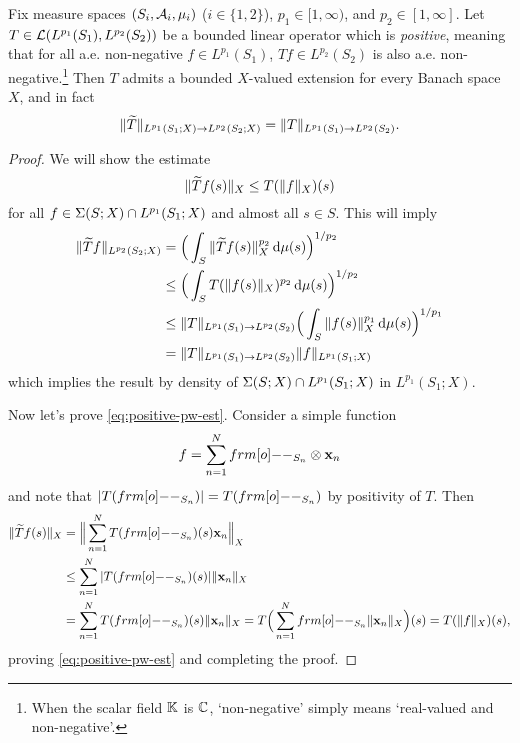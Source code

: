 \begin{thm}\label{thm:positive-extensions}
  Fix measure spaces $(S_i,\mathcal{A}_i,\mu_i)$ ($i \in \{1,2\}$), $p_1 \in [1,\infty)$, and $p_2 \in [1,\infty]$.
  Let $T \in \mathcal{L}(L^{p_1}(S_1),L^{p_2}(S_2))$ be a bounded linear operator which is \emph{positive}, meaning that for all a.e. non-negative $f \in L^{p_1}(S_1)$, $Tf \in L^{p_2}(S_2)$ is also a.e. non-negative.\footnote{When the scalar field $\mathbb{K}$ is $\mathbb{C}$, `non-negative' simply means `real-valued and non-negative'.}
  Then $T$ admits a bounded $X$-valued extension for every Banach space $X$, and in fact
  \begin{equation*}
    \|\widetilde{T}\|_{L^{p_1}(S_1;X) \to L^{p_2}(S_2;X)} = \|T\|_{L^{p_1}(S_1) \to L^{p_2}(S_2)}.
  \end{equation*}
\end{thm}

\begin{proof}
  We will show the estimate
  \begin{equation}\label{eq:positive-pw-est}
    \|\widetilde{T}f(s)\|_X \leq T(\|f\|_X)(s)
  \end{equation}
  for all $f \in \Sigma(S;X) \cap L^{p_1}(S_1;X)$ and almost all $s \in S$.
  This will imply
  \begin{equation*}
    \begin{aligned}
      \|\widetilde{T}f\|_{L^{p_2}(S_2;X)} &= \Big( \int_{S} \|\widetilde{T}f(s)\|_X^{p_2} \, \mathrm{d}\mu(s) \Big)^{1/p_2} \\
      &\leq \Big( \int_{S} T(\|f(s)\|_X)^{p_2} \, \mathrm{d}\mu(s) \Big)^{1/p_2}\\
      &\leq \|T\|_{L^{p_1}(S_1) \to L^{p_2}(S_2)} \Big( \int_{S} \|f(s)\|_X^{p_1} \, \mathrm{d}\mu(s) \Big)^{1/p_1} \\
      &= \|T\|_{L^{p_1}(S_1) \to L^{p_2}(S_2)} \|f\|_{L^{p_1}(S_1;X)}
    \end{aligned}
  \end{equation*}
  which implies the result by density of $\Sigma(S;X) \cap L^{p_1}(S_1;X)$ in $L^{p_1}(S_1;X)$.

  Now let's prove \eqref{eq:positive-pw-est}.
  Consider a simple function
  \begin{equation*}
    f = \sum_{n=1}^N \1_{S_n} \otimes \mb{x}_n
  \end{equation*}
  and note that $|T(\1_{S_n})| = T(\1_{S_n})$ by positivity of $T$.
  Then
  \begin{equation*}
    \begin{aligned}
      \|\td{T}f(s)\|_X &= \Big\| \sum_{n=1}^N T(\1_{S_n})(s) \mb{x}_n \Big\|_X \\
      &\leq \sum_{n=1}^N |T(\1_{S_n})(s)| \|\mb{x}_n\|_X \\
      &= \sum_{n=1}^N T(\1_{S_n})(s) \|\mb{x}_n\|_X 
      = T\Big( \sum_{n=1}^N \1_{S_n} \|\mb{x}_n\|_X \Big)(s) 
      = T(\|f\|_X)(s),
    \end{aligned}
  \end{equation*}
  proving \eqref{eq:positive-pw-est} and completing the proof.
\end{proof}

